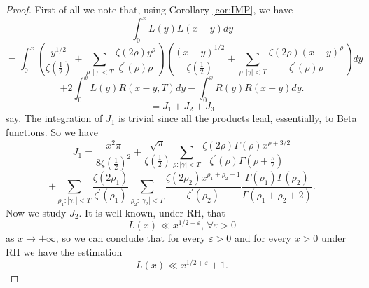 \documentclass[10pt,a4paper]{amsart}
\begin{document}
\begin{proof}
First of all we note that, using Corollary \ref{cor:IMP}, we have
\[
\int_{0}^{x}L\left(y\right)L\left(x-y\right)dy
\]
\[
=\int_{0}^{x}\left(\frac{y^{1/2}}{\zeta\left(\frac{1}{2}\right)}+\sum_{\rho:\left|\gamma\right|<T}\frac{\zeta\left(2\rho\right)y^{\rho}}{\zeta^{\prime}\left(\rho\right)\rho}\right)\left(\frac{(x-y)^{1/2}}{\zeta\left(\frac{1}{2}\right)}+\sum_{\rho:\left|\gamma\right|<T}\frac{\zeta\left(2\rho\right)(x-y)^{\rho}}{\zeta^{\prime}\left(\rho\right)\rho}\right)dy
\]
\[
+2\int_{0}^{x}L\left(y\right)R\left(x-y,T\right)dy-\int_{0}^{x}R\left(y\right)R\left(x-y\right)dy.
\]
\[
=J_{1}+J_{2}+J_{3}
\]
say. The integration of $J_{1}$ is trivial since all the products
lead, essentially, to Beta functions. So we have
\[
J_{1}=\frac{x^{2}\pi}{8\zeta\left(\frac{1}{2}\right)^{2}}+\frac{\sqrt{\pi}}{\zeta\left(\frac{1}{2}\right)}\sum_{\rho:\left|\gamma\right|<T}\frac{\zeta\left(2\rho\right)\Gamma\left(\rho\right)x^{\rho+3/2}}{\zeta^{\prime}\left(\rho\right)\Gamma\left(\rho+\frac{5}{2}\right)}
\]
\[
+\sum_{\rho_{1}:\left|\gamma_{1}\right|<T}\frac{\zeta\left(2\rho_{1}\right)}{\zeta^{\prime}\left(\rho_{1}\right)}\sum_{\rho_{2}:\left|\gamma_{2}\right|<T}\frac{\zeta\left(2\rho_{2}\right)x^{\rho_{1}+\rho_{2}+1}}{\zeta^{\prime}\left(\rho_{2}\right)}\frac{\Gamma\left(\rho_{1}\right)\Gamma\left(\rho_{2}\right)}{\Gamma\left(\rho_{1}+\rho_{2}+2\right)}.
\]
Now we study $J_{2}$. It is well-known, under RH, that
\[
L\left(x\right)\ll x^{1/2+\varepsilon},\,\forall\varepsilon>0
\]
as $x\rightarrow+\infty$, so we can conclude that for every $\varepsilon>0$
and for every $x>0$ under RH we have the estimation
\[
L\left(x\right)\ll x^{1/2+\varepsilon}+1.
\]


\end{proof}
\end{document}
